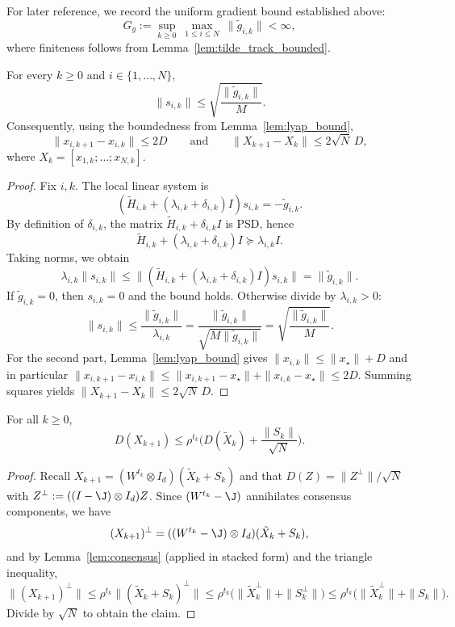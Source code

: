 \documentclass[review,onefignum,onetabnum]{siamart171218}
\begin{document}
For later reference, we record the uniform gradient bound established above:
\begin{equation}\label{eq:step_unif_app}
G_g:=\sup_{k\ge 0}\ \max_{1\le i\le N}\ \|\tilde g_{i,k}\| < \infty,
\end{equation}
where finiteness follows from Lemma~\ref{lem:tilde_track_bounded}.


\begin{lemma}\label{lem:step_bound_app}
For every $k\ge0$ and $i\in\{1,\dots,N\}$,
\[
\|s_{i,k}\|\le \sqrt{\frac{\|\tilde g_{i,k}\|}{M}}.
\]
Consequently, using the boundedness from Lemma~\ref{lem:lyap_bound},
\[
\|x_{i,k+1}-x_{i,k}\|\le 2D
\qquad\text{and}\qquad
\|X_{k+1}-X_k\|\le 2\sqrt N\,D,
\]
where $X_k=[x_{1,k};\dots;x_{N,k}]$.
\end{lemma}
\begin{proof}
Fix $i,k$. The local linear system is
\[
(\tilde H_{i,k}+(\lambda_{i,k}+\delta_{i,k})I)s_{i,k}=-\tilde g_{i,k}.
\]
By definition of $\delta_{i,k}$, the matrix $\tilde H_{i,k}+\delta_{i,k}I$ is PSD, hence
\[
\tilde H_{i,k}+(\lambda_{i,k}+\delta_{i,k})I \succeq \lambda_{i,k}I.
\]
Taking norms, we obtain
\[
\lambda_{i,k}\|s_{i,k}\|\le \|(\tilde H_{i,k}+(\lambda_{i,k}+\delta_{i,k})I)s_{i,k}\|=\|\tilde g_{i,k}\|.
\]
If $\tilde g_{i,k}=0$, then $s_{i,k}=0$ and the bound holds. Otherwise divide by $\lambda_{i,k}>0$:
\[
\|s_{i,k}\|\le \frac{\|\tilde g_{i,k}\|}{\lambda_{i,k}}
=\frac{\|\tilde g_{i,k}\|}{\sqrt{M\|\tilde g_{i,k}\|}}
=\sqrt{\frac{\|\tilde g_{i,k}\|}{M}}.
\]
For the second part, Lemma~\ref{lem:lyap_bound} gives $\|x_{i,k}\|\le \|x_\star\|+D$ and in particular
$\|x_{i,k+1}-x_{i,k}\|\le \|x_{i,k+1}-x_\star\|+\|x_{i,k}-x_\star\|\le 2D$.
Summing squares yields $\|X_{k+1}-X_k\|\le 2\sqrt N\,D$.
\end{proof}

\begin{lemma}\label{lem:DX_post}
For all $k\ge 0$,
\[
D(X_{k+1})\le \rho^{t_k}\Big(D(\tilde X_k)+\frac{\|S_k\|}{\sqrt N}\Big).
\]
\end{lemma}
\begin{proof}
Recall $X_{k+1}=(W^{t_k}\otimes I_d)(\tilde X_k+S_k)$ and that $D(Z)=\|Z^\perp\|/\sqrt N$ with $Z^\perp:=((I-\J)\otimes I_d)Z$.
Since $(W^{t_k}-\J)$ annihilates consensus components, we have
\[
(X_{k+1})^\perp = ((W^{t_k}-\J)\otimes I_d)(\tilde X_k+S_k),
\]
and by Lemma~\ref{lem:consensus} (applied in stacked form) and the triangle inequality,
\[
\| (X_{k+1})^\perp\|
\le \rho^{t_k}\|(\tilde X_k+S_k)^\perp\|
\le \rho^{t_k}\big(\|\tilde X_k^\perp\|+\|S_k^\perp\|\big)
\le \rho^{t_k}\big(\|\tilde X_k^\perp\|+\|S_k\|\big).
\]
Divide by $\sqrt N$ to obtain the claim.
\end{proof}
\end{document}
